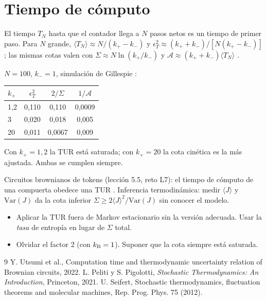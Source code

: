 \documentclass[11pt,a4paper]{article}
\begin{document}
\section{Tiempo de cómputo}
El tiempo $T_N$ hasta que el contador llega a $N$ pasos netos es un tiempo de primer paso. Para $N$ grande,
$\langle T_N\rangle\approx N/(k_+-k_-)$ y $\epsilon_T^2\approx(k_++k_-)/[N(k_+-k_-)]$; las mismas cotas valen con $\Sigma\approx N\ln(k_+/k_-)$ y
$\mathcal A\approx(k_++k_-)\langle T_N\rangle$ \cite{utsumi}.
\begin{ejemplo}
$N=100$, $k_-=1$, simulación de Gillespie \evS:
\begin{center}\begin{tabular}{lccc}\toprule
$k_+$ & $\epsilon_T^2$ & $2/\Sigma$ & $1/\mathcal A$\\\midrule
1,2 & 0,110 & 0,110 & 0,0009\\
3 & 0,020 & 0,018 & 0,005\\
20 & 0,011 & 0,0067 & 0,009\\\bottomrule\end{tabular}\end{center}
Con $k_+=1{,}2$ la TUR está saturada; con $k_+=20$ la cota cinética es la más ajustada. Ambas se cumplen siempre.
\end{ejemplo}

\begin{aplicacion}
Circuitos brownianos de tokens (lección 5.5, reto L7): el tiempo de cómputo de una compuerta obedece una TUR \cite{utsumi}. Inferencia
termodinámica: medir $\langle J\rangle$ y $\mathrm{Var}(J)$ da la cota inferior $\Sigma\ge2\langle J\rangle^2/\mathrm{Var}(J)$ sin conocer el modelo.
\end{aplicacion}

\begin{error}
\begin{itemize}[nosep]
\item Aplicar la TUR fuera de Markov estacionario sin la versión adecuada. \quad Usar la \emph{tasa} de entropía en lugar de $\Sigma$ total.
\item Olvidar el factor 2 (con $k_{\mathrm B}=1$). \quad Suponer que la cota siempre está saturada.
\end{itemize}
\end{error}

\begin{thebibliography}{9}\small
{} Y. Utsumi et al., Computation time and thermodynamic uncertainty relation of Brownian circuits, 2022.
 L. Peliti y S. Pigolotti, \emph{Stochastic Thermodynamics: An Introduction}, Princeton, 2021.
 U. Seifert, Stochastic thermodynamics, fluctuation theorems and molecular machines, Rep. Prog. Phys. 75 (2012).
\end{thebibliography}
\end{document}
